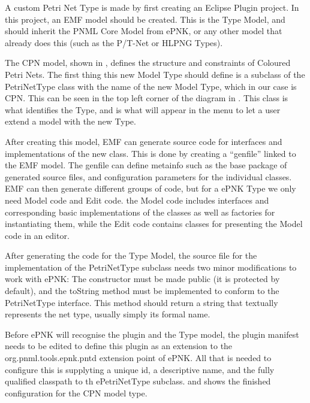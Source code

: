 A custom Petri Net Type is made by first creating an Eclipse Plugin project. 
In this project, an EMF model should be created. This is the Type Model, and
should inherit the PNML Core Model from ePNK, or any other model that already
does this (such as the P/T-Net or HLPNG Types). 

The CPN model, shown in , defines the structure and
constraints of Coloured Petri Nets. The first thing this new Model Type should
define is a subclass of the PetriNetType class with the name of the new Model
Type, which in our case is CPN. This can be seen in the top left corner of the
diagram in . This class is what identifies the Type,
and is what will appear in the menu to let a user extend a model with the new
Type.

After creating this model, EMF can generate source code for interfaces and
implementations of the new class. This is done by creating a ``genfile''
linked to the EMF model. The genfile can define metainfo such as the base
package of generated source files, and configuration parameters for the
individual classes. EMF can then generate different groups of code, but for a
ePNK Type we only need Model code and Edit code. the Model code includes
interfaces and corresponding basic implementations of the classes as well as
factories for instantiating them, while the Edit code contains classes for
presenting the Model code in an editor.

After generating the code for the Type Model, the source file for
the implementation of the PetriNetType subclass needs two minor modifications
to work with ePNK: The constructor must be made public (it is protected by
default), and the toString method must be implemented to conform to the
PetriNetType interface. This method should return a string that textually
represents the net type, usually simply its formal name.

Before ePNK will recognise the plugin and the Type model, the plugin manifest
needs to be edited to define this plugin as an extension to the
org.pnml.tools.epnk.pntd extension point of ePNK. All that is needed to
configure this is supplyting a unique id, a descriptive name, and the fully
qualified classpath to th ePetriNetType subclass.  and
 shows the finished configuration for the CPN model
type. 

